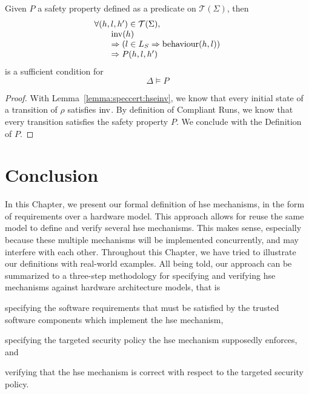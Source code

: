 \begin{theorem}
  \label{theorem:speccert:correcthse}
  Given $P$ a safety property defined as a predicate on $\mathcal{T}(\Sigma)$,
  then
  \[
    \begin{array}{l}
      \forall (h, l, h') \in \mathcal{T}(\Sigma), \\
      \qquad \mathrm{inv}(h) \\
      \qquad \Rightarrow (l \in L_{S} \Rightarrow \mathrm{behaviour}(h, l))\\
      \qquad \Rightarrow P(h, l, h')
    \end{array}
  \]
  is a sufficient condition for
  \[
    \Delta \models P
  \]

  \begin{proof}
    With Lemma~\ref{lemma:speccert:hseinv}, we know that every initial state of
    a transition of $\rho$ satisfies $\mathrm{inv}$.
    By definition of Compliant Runs, we know that every transition satisfies the
    safety property $P$.
    We conclude with the Definition of $P$.
  \end{proof}
\end{theorem}

\section{Conclusion}

In this Chapter, we present our formal definition of \ac{hse} mechanisms, in the
form of requirements over a hardware model.
%
This approach allows for reuse the same model to define and verify several
\ac{hse} mechanisms.
%
This makes sense, especially because these multiple mechanisms will be
implemented concurrently, and may interfere with each other.
%
Throughout this Chapter, we have tried to illustrate our definitions with
real-world examples.
%
All being told, our approach can be summarized to a three-step methodology for
specifying and verifying \ac{hse} mechanisms against hardware architecture
models, that is
%
\begin{inparaenum}[(1)]
\item specifying the software requirements that must be satisfied by the trusted
  software components which implement the \ac{hse} mechanism,
%
\item specifying the targeted security policy the \ac{hse} mechanism supposedly
  enforces, and
%
\item verifying that the \ac{hse} mechanism is correct with respect to the
  targeted security policy.
\end{inparaenum}

